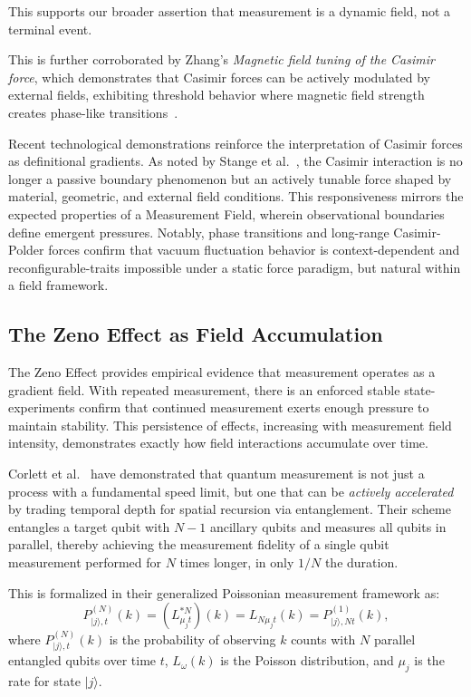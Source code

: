 This supports our broader assertion that measurement is a dynamic field, not a terminal event.

This is further corroborated by Zhang's \emph{Magnetic field tuning of the Casimir force}, which demonstrates that Casimir forces can be actively modulated by external fields, exhibiting threshold behavior where magnetic field strength creates phase-like transitions~\cite{zhang2024}.

Recent technological demonstrations reinforce the interpretation of Casimir forces as definitional gradients. As noted by Stange et al.~\cite{stange_science_2021}, the Casimir interaction is no longer a passive boundary phenomenon but an actively tunable force shaped by material, geometric, and external field conditions. This responsiveness mirrors the expected properties of a Measurement Field, wherein observational boundaries define emergent pressures. Notably, phase transitions and long-range Casimir-Polder forces confirm that vacuum fluctuation behavior is context-dependent and reconfigurable-traits impossible under a static force paradigm, but natural within a field framework.

\subsection{The Zeno Effect as Field Accumulation}

The Zeno Effect provides empirical evidence that measurement operates as a gradient field. With repeated measurement, there is an enforced stable state-experiments confirm that continued measurement exerts enough pressure to maintain stability. This persistence of effects, increasing with measurement field intensity, demonstrates exactly how field interactions accumulate over time.

Corlett et al.~\cite{corlett_speeding_2025} have demonstrated that quantum measurement is not just a process with a fundamental speed limit, but one that can be \emph{actively accelerated} by trading temporal depth for spatial recursion via entanglement. Their scheme entangles a target qubit with $N-1$ ancillary qubits and measures all qubits in parallel, thereby achieving the measurement fidelity of a single qubit measurement performed for $N$ times longer, in only $1/N$ the duration.

This is formalized in their generalized Poissonian measurement framework as:
\begin{equation}
P^{(N)}_{|j\rangle, t}(k) = (L_{\mu_j t}^{\ast N})(k) = L_{N \mu_j t}(k) = P^{(1)}_{|j\rangle, N t}(k),
\end{equation}
where $P^{(N)}_{|j\rangle, t}(k)$ is the probability of observing $k$ counts with $N$ parallel entangled qubits over time $t$, $L_{\omega}(k)$ is the Poisson distribution, and $\mu_j$ is the rate for state $|j\rangle$.

